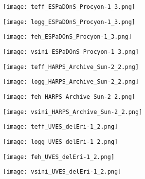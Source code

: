 \documentclass[fleqn,usenatbib]{mnras}
\begin{document}
\begin{figure*}%
 \vspace{-0.2cm}
 \centering
 \begin{minipage}{0.21\textwidth}
  \texttt{[image: teff\_ESPaDOnS\_Procyon-1\_3.png]} 
 \end{minipage}
\hspace{0.02\textwidth}%
 \begin{minipage}{0.21\textwidth}
  \texttt{[image: logg\_ESPaDOnS\_Procyon-1\_3.png]} 
 \end{minipage}
\hspace{0.02\textwidth}%
 \begin{minipage}{0.21\textwidth}
  \texttt{[image: feh\_ESPaDOnS\_Procyon-1\_3.png]} 
 \end{minipage}
\hspace{0.02\textwidth}%
 \begin{minipage}{0.21\textwidth}
  \texttt{[image: vsini\_ESPaDOnS\_Procyon-1\_3.png]} 
 \end{minipage}

  \centering
 \begin{minipage}{0.21\textwidth}
  \texttt{[image: teff\_HARPS\_Archive\_Sun-2\_2.png]} 
 \end{minipage}
\hspace{0.02\textwidth}%
 \begin{minipage}{0.21\textwidth}
  \texttt{[image: logg\_HARPS\_Archive\_Sun-2\_2.png]} 
 \end{minipage}
\hspace{0.02\textwidth}%
 \begin{minipage}{0.21\textwidth}
  \texttt{[image: feh\_HARPS\_Archive\_Sun-2\_2.png]} 
 \end{minipage}
\hspace{0.02\textwidth}%
 \begin{minipage}{0.21\textwidth}
  \texttt{[image: vsini\_HARPS\_Archive\_Sun-2\_2.png]} 
 \end{minipage}

  \centering
 \begin{minipage}{0.21\textwidth}
  \texttt{[image: teff\_UVES\_delEri-1\_2.png]} 
 \end{minipage}
\hspace{0.02\textwidth}%
 \begin{minipage}{0.21\textwidth}
  \texttt{[image: logg\_UVES\_delEri-1\_2.png]} 
 \end{minipage}
\hspace{0.02\textwidth}%
 \begin{minipage}{0.21\textwidth}
  \texttt{[image: feh\_UVES\_delEri-1\_2.png]} 
 \end{minipage}
\hspace{0.02\textwidth}%
 \begin{minipage}{0.21\textwidth}
  \texttt{[image: vsini\_UVES\_delEri-1\_2.png]} 
 \end{minipage}


\end{figure*}
\end{document}
